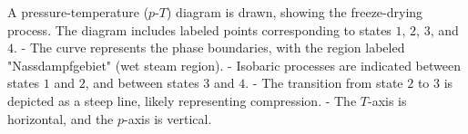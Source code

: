 A pressure-temperature (\(p\)-\(T\)) diagram is drawn, showing the freeze-drying process. The diagram includes labeled points corresponding to states \(1\), \(2\), \(3\), and \(4\).  
- The curve represents the phase boundaries, with the region labeled "Nassdampfgebiet" (wet steam region).  
- Isobaric processes are indicated between states \(1\) and \(2\), and between states \(3\) and \(4\).  
- The transition from state \(2\) to \(3\) is depicted as a steep line, likely representing compression.  
- The \(T\)-axis is horizontal, and the \(p\)-axis is vertical.